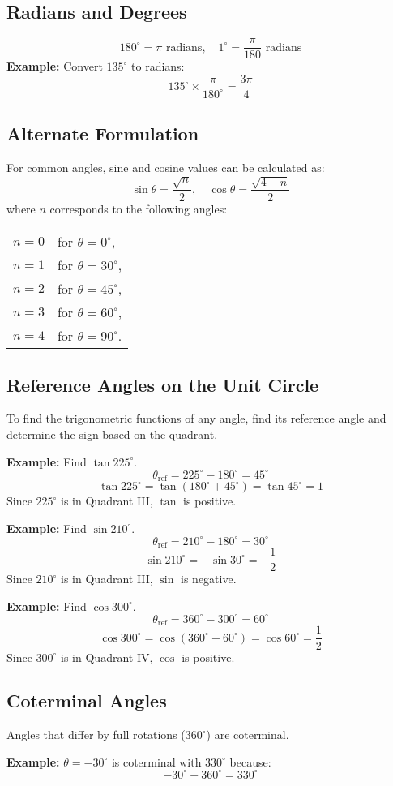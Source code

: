 \documentclass{article}
\begin{document}
\begin{multicols}{2}
\subsection*{Radians and Degrees}
\[
180^\circ = \pi \text{ radians}, \quad 1^\circ = \dfrac{\pi}{180} \text{ radians}
\]
\textbf{Example:} Convert \( 135^\circ \) to radians:
\[
135^\circ \times \dfrac{\pi}{180^\circ} = \dfrac{3\pi}{4}
\]

\subsection*{Alternate Formulation}
For common angles, sine and cosine values can be calculated as:
\[
\sin \theta = \dfrac{\sqrt{n}}{2}, \quad \cos \theta = \dfrac{\sqrt{4 - n}}{2}
\]
where \( n \) corresponds to the following angles:
\begin{center}
\begin{tabular}{ll}
\( n = 0 \) & for \( \theta = 0^\circ \), \\
\( n = 1 \) & for \( \theta = 30^\circ \), \\
\( n = 2 \) & for \( \theta = 45^\circ \), \\
\( n = 3 \) & for \( \theta = 60^\circ \), \\
\( n = 4 \) & for \( \theta = 90^\circ \). \\
\end{tabular}
\end{center}

\subsection*{Reference Angles on the Unit Circle}
To find the trigonometric functions of any angle, find its reference angle and determine the sign based on the quadrant.

\textbf{Example:} Find \(\tan 225^\circ\).
\[
\theta_{\text{ref}} = 225^\circ - 180^\circ = 45^\circ
\]
\[
\tan 225^\circ = \tan (180^\circ + 45^\circ) = \tan 45^\circ = 1
\]
Since \(225^\circ\) is in Quadrant III, \(\tan\) is positive.

\textbf{Example:} Find \(\sin 210^\circ\).
\[
\theta_{\text{ref}} = 210^\circ - 180^\circ = 30^\circ
\]
\[
\sin 210^\circ = -\sin 30^\circ = -\dfrac{1}{2}
\]
Since \(210^\circ\) is in Quadrant III, \(\sin\) is negative.

\textbf{Example:} Find \(\cos 300^\circ\).
\[
\theta_{\text{ref}} = 360^\circ - 300^\circ = 60^\circ
\]
\[
\cos 300^\circ = \cos (360^\circ - 60^\circ) = \cos 60^\circ = \dfrac{1}{2}
\]
Since \(300^\circ\) is in Quadrant IV, \(\cos\) is positive.

\subsection*{Coterminal Angles}
Angles that differ by full rotations (\(360^\circ\)) are coterminal.

\textbf{Example:} \( \theta = -30^\circ \) is coterminal with \( 330^\circ \) because:
\[
-30^\circ + 360^\circ = 330^\circ
\]

\end{multicols}
\end{document}
